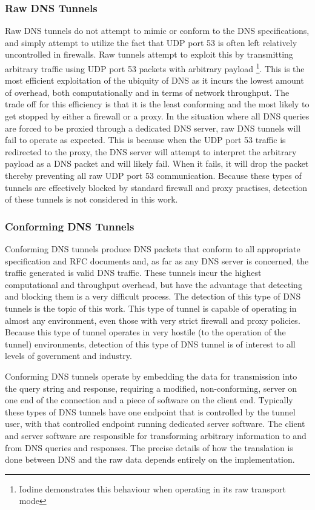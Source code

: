 \documentclass[12pt]{report}
\theoremstyle{remark}
\theoremstyle{definition}
\theoremstyle{definition}
\theoremstyle{definition}
\begin{document}
\subsubsection{Raw DNS Tunnels}
\label{tunnels-types-raw}
Raw DNS tunnels do not attempt to mimic or conform to the DNS specifications,
and simply attempt to utilize the fact that UDP port 53 is often left relatively
uncontrolled in firewalls. Raw tunnels attempt to exploit this by transmitting
arbitrary traffic using UDP port 53 packets with arbitrary payload 
\footnote{Iodine demonstrates this behaviour when operating in its raw
transport mode}. This is the most efficient exploitation of the ubiquity of DNS
as it incurs the lowest amount of overhead, both computationally and in terms of
network throughput. The trade off for this efficiency is that it is the least
conforming and the most likely to get stopped by either a firewall or a proxy.
In the situation where all DNS queries are forced to be proxied through a
dedicated DNS server, raw DNS tunnels will fail to operate as expected. This is
because when the UDP port 53 traffic is redirected to the proxy, the DNS server
will attempt to interpret the arbitrary payload as a DNS packet and will likely
fail. When it fails, it will drop the packet thereby preventing all raw UDP port
53 communication. Because these types of tunnels are effectively blocked by
standard firewall and proxy practises, detection of these tunnels is not
considered in this work.

\subsubsection{Conforming DNS Tunnels}
\label{tunnels-types-conforming}
Conforming DNS tunnels produce DNS packets that conform to all appropriate
specification and RFC documents and, as far as any DNS server is concerned, the
traffic generated is valid DNS traffic. These tunnels incur the highest
computational and throughput overhead, but have the advantage that detecting and
blocking them is a very difficult process. The detection of this type of DNS
tunnels is the topic of this work. This type of tunnel is capable of operating
in almost any environment, even those with very strict firewall and proxy policies. Because
this type of tunnel operates in very hostile (to the operation of the tunnel)
environments, detection of this type of DNS tunnel is of interest to all levels
of government and industry.

Conforming DNS tunnels operate by embedding the data for transmission into the
query string and response, requiring a modified, non-conforming, server on one
end of the connection and a piece of software on the client end. Typically these
types of DNS tunnels have one endpoint that is controlled by the tunnel user,
with that controlled endpoint running dedicated server software. The client and
server software are responsible for transforming arbitrary information to and
from DNS queries and responses. The precise details of how the translation is
done between DNS and the raw data depends entirely on the implementation.
\end{document}
